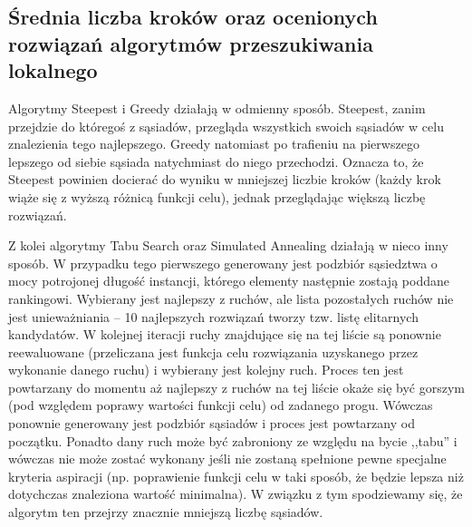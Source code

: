 \subsection{Średnia liczba kroków oraz ocenionych rozwiązań algorytmów przeszukiwania lokalnego}
Algorytmy Steepest i Greedy działają w odmienny sposób. Steepest, zanim przejdzie do któregoś z sąsiadów, przegląda wszystkich swoich sąsiadów w celu znalezienia tego najlepszego. Greedy natomiast po trafieniu na pierwszego lepszego od siebie sąsiada natychmiast do niego przechodzi. Oznacza to, że Steepest powinien docierać do wyniku w mniejszej liczbie kroków (każdy krok wiąże się z wyższą różnicą funkcji celu), jednak przeglądając większą liczbę rozwiązań.

Z kolei algorytmy Tabu Search oraz Simulated Annealing działają w nieco inny sposób. W przypadku tego pierwszego generowany jest podzbiór sąsiedztwa o mocy potrojonej długość instancji, którego elementy następnie zostają poddane rankingowi. Wybierany jest najlepszy z ruchów, ale lista pozostałych ruchów nie jest unieważniania -- 10 najlepszych rozwiązań tworzy tzw. listę elitarnych kandydatów. W kolejnej iteracji ruchy znajdujące się na tej liście są ponownie reewaluowane (przeliczana jest funkcja celu rozwiązania uzyskanego przez wykonanie danego ruchu) i wybierany jest kolejny ruch. Proces ten jest powtarzany do momentu aż najlepszy z ruchów na tej liście okaże się być gorszym (pod względem poprawy wartości funkcji celu) od zadanego progu. Wówczas ponownie generowany jest podzbiór sąsiadów i proces jest powtarzany od początku. Ponadto dany ruch może być zabroniony ze względu na bycie ,,tabu'' i wówczas nie może zostać wykonany jeśli nie zostaną spełnione pewne specjalne kryteria aspiracji (np. poprawienie funkcji celu w taki sposób, że będzie lepsza niż dotychczas znaleziona wartość minimalna). W związku z tym spodziewamy się, że algorytm ten przejrzy znacznie mniejszą liczbę sąsiadów.

